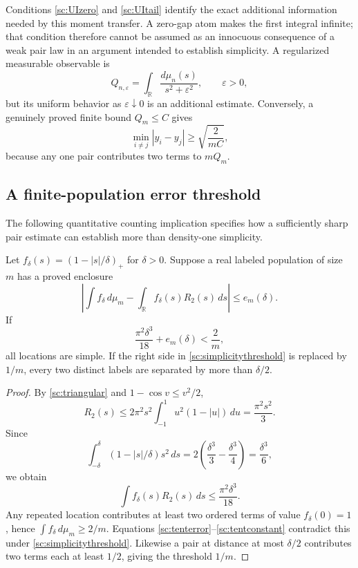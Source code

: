 Conditions \eqref{sc:UIzero} and \eqref{sc:UItail} identify the exact
additional information needed by this moment transfer. A zero-gap atom
makes the first integral infinite; that condition therefore cannot be
assumed as an innocuous consequence of a weak pair law in an argument
intended to establish simplicity. A regularized measurable observable is
\[
 Q_{n,\varepsilon}=\int_{\mathbb R}
     \frac{d\mu_n(s)}{s^2+\varepsilon^2},\qquad\varepsilon>0,
\]
but its uniform behavior as $\varepsilon\downarrow0$ is an additional
estimate. Conversely, a genuinely proved finite bound $Q_m\le C$ gives
\begin{equation}
 \min_{i\ne j}|y_i-y_j|\ge\sqrt{\frac{2}{mC}},
 \label{sc:mingap}
\end{equation}
because any one pair contributes two terms to $mQ_m$.

\subsection{A finite-population error threshold}
\label{sc:tent}

The following quantitative counting implication specifies how a
sufficiently sharp pair estimate can establish more than density-one
simplicity.

\begin{proposition}
\label{sc:tenttheorem}
Let $f_\delta(s)=(1-|s|/\delta)_+$ for $\delta>0$. Suppose a real labeled
population of size $m$ has a proved enclosure
\begin{equation}
 \left|\int f_\delta\,d\mu_m
       -\int_{\mathbb R}f_\delta(s)R_2(s)\,ds\right|
 \le e_m(\delta).
 \label{sc:tenterror}
\end{equation}
If
\begin{equation}
 \frac{\pi^2\delta^3}{18}+e_m(\delta)<\frac2m,
 \label{sc:simplicitythreshold}
\end{equation}
all locations are simple. If the right side in
\eqref{sc:simplicitythreshold} is replaced by $1/m$, every two distinct
labels are separated by more than $\delta/2$.
\end{proposition}

\begin{proof}
By \eqref{sc:triangular} and $1-\cos v\le v^2/2$,
\[
 R_2(s)\le2\pi^2s^2
       \int_{-1}^{1}u^2(1-|u|)\,du
       =\frac{\pi^2s^2}{3}.
\]
Since
\[
 \int_{-\delta}^{\delta}(1-|s|/\delta)s^2\,ds
 =2\left(\frac{\delta^3}{3}-\frac{\delta^3}{4}\right)
 =\frac{\delta^3}{6},
\]
we obtain
\begin{equation}
 \int f_\delta(s)R_2(s)\,ds\le\frac{\pi^2\delta^3}{18}.
 \label{sc:tentconstant}
\end{equation}
Any repeated location contributes at least two ordered terms of value
$f_\delta(0)=1$, hence $\int f_\delta\,d\mu_m\ge2/m$.
Equations \eqref{sc:tenterror}--\eqref{sc:tentconstant} contradict this
under \eqref{sc:simplicitythreshold}. Likewise a pair at distance at
most $\delta/2$ contributes two terms each at least $1/2$, giving the
threshold $1/m$.
\end{proof}

